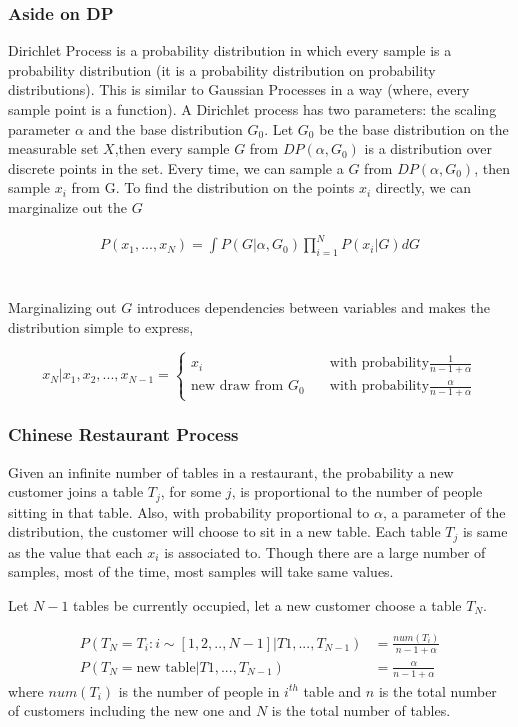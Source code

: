 \documentclass{article}[11pt]
\begin{document}
\subsubsection{Aside on DP}
Dirichlet Process is a probability distribution in which every sample is a probability distribution (it is a probability distribution on probability distributions). This is similar to Gaussian Processes in a way (where, every sample point is a function). A Dirichlet process has two parameters: the scaling parameter $\alpha$ and the base distribution $G_0$. Let $G_0$ be the base distribution on the measurable set $X$,then every sample $G$ from $DP(\alpha, G_0)$ is a distribution over discrete points in the set. Every time, we can sample a $G$ from  $DP(\alpha, G_0)$, then sample $x_i$ from G. To find the distribution on the points $x_i$ directly, we can marginalize out the $G$

\begin{align*}
P(x_1, ..., x_N) = \int P(G|\alpha,G_0)\prod_{i=1}^N P(x_i|G)dG
\end{align*}\\ \\
Marginalizing out $G$ introduces dependencies between variables and makes the distribution simple to express,

\[   
x_N|x_1, x_2, ...,x_{N-1} = 
     \begin{cases}
       x_i &\quad\text{with probability} \frac{1}{n-1+\alpha}\\
       \text{new draw from }G_0 &\quad\text{with probability} \frac{\alpha}{n-1+\alpha}
     \end{cases}
\]


\subsubsection{Chinese Restaurant Process}
Given an infinite number of tables in a restaurant, the probability a new customer joins a table $T_j$, for some $j$, is proportional to the number of people sitting in that table. Also, with probability proportional to $\alpha$, a parameter of the distribution, the customer will choose to sit in a new table. Each table $T_j$ is same as the value that each $x_i$ is associated to. Though there are a large number of samples, most of the time, most samples will take same values. 

Let $N-1$ tables be currently occupied, let a new customer choose a table $T_N$.

\begin{align}
\label{dirichlet}
P(T_N = T_i : i \sim [1, 2, .., N-1]| T1,...,T_{N-1}) &= \frac{num(T_i)}{n-1+\alpha}\\
P(T_N = \text{new table} | T1,...,T_{N-1}) &= \frac{\alpha}{n-1+\alpha}
\end{align} where $num(T_i)$ is the number of people in $i^{th}$ table and $n$ is the total number of customers including the new one and $N$ is the total number of tables.
\end{document}
